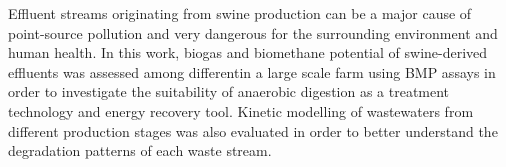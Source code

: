 Effluent streams originating from swine production can be a major cause of point-source pollution and very dangerous for the surrounding environment and human health. In this work, biogas and biomethane potential of swine-derived effluents was assessed among differentin a large scale farm using BMP assays in order to investigate the suitability of anaerobic digestion as a treatment technology and energy recovery tool. Kinetic modelling of wastewaters from different production stages was also evaluated in order to better understand the degradation patterns of each waste stream.